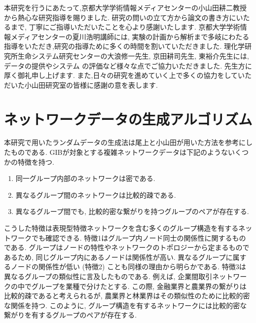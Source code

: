 \documentclass{kuee}
\begin{document}
\begin{acknowledgements}
  本研究を行うにあたって,京都大学学術情報メディアセンターの小山田耕二教授から熱心な研究指導を賜りました.
  研究の問いの立て方から論文の書き方にいたるまで, 丁寧にご指導いただいたことを心より感謝いたします.
  京都大学学術情報メディアセンターの夏川浩明講師には, 実験の計画から解析まで多岐にわたる指導をいただき,研究の指導ために多くの時間を割いていただきました.
  理化学研究所生命システム研究センターの大浪修一先生, 京田耕司先生, 東裕介先生には,データの提供やシステム
  の評価など様々な点でご協力いただきました.
  先生方に厚く御礼申し上げます.
  また,日々の研究を進めていく上で多くの協力をしていただいた小山田研究室の皆様に感謝の意を表します.
\end{acknowledgements}








\appendix

\chapter{ネットワークデータの生成アルゴリズム}
\label{chap:data_algorithm}

本研究で用いたランダムデータの生成法は尾上と小山田が用いた方法を参考にしたものである\cite{onoue2017optimal}.
GIBが対象とする複雑ネットワークデータは下記のようないくつかの特徴を持つ.
\begin{enumerate}
  \item 同一グループ内部のネットワークは密である.
  \item 異なるグループ間のネットワークは比較的疎である.
  \item 異なるグループ間でも, 比較的密な繋がりを持つグループのペアが存在する.
\end{enumerate}
こうした特徴は表現型特徴ネットワークを含む多くのグループ構造を有するネットワークでも確認できる.
特徴1はグループ内ノード同士の関係性に関するものである.
グループはノードの特性やネットワークのトポロジーから定まるものであるため, 同じグループ内にあるノードは関係性が高い.
異なるグループに属するノードの関係性が低い (特徴2) ことも同様の理由から明らかである.
特徴3は異なるグループの類似性に言及したものである.
例えば, 企業間取引ネットワークの中でグループを業種で分けたとする.
この際, 金融業界と農業界の繋がりは比較的疎であると考えられるが, 農業界と林業界はその類似性のために比較的密な関係を持つ.
このように, グループ構造を有するネットワークには比較的密な繋がりを有するグループのペアが存在する.
\end{document}
